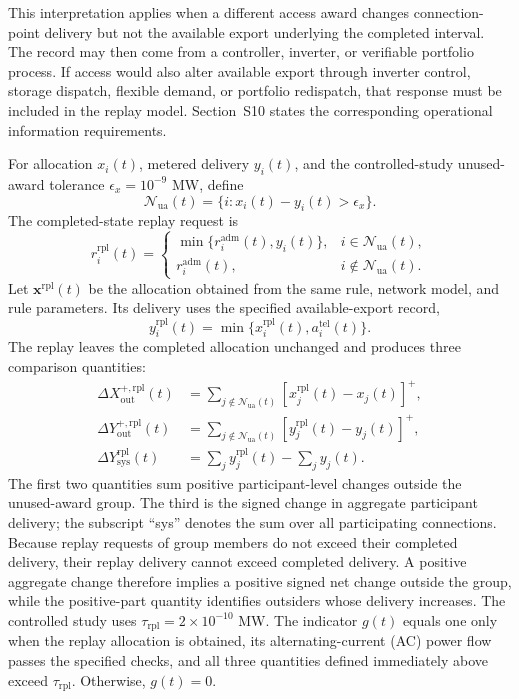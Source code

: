 \documentclass[11pt]{article}
\begin{document}
This interpretation applies when a different access award changes
connection-point delivery but not the available export underlying the completed
interval. The record may then come from a controller, inverter, or verifiable
portfolio process. If access would also alter available export through inverter
control, storage dispatch, flexible demand, or portfolio redispatch, that
response must be included in the replay model. Section~S10 states the
corresponding operational information requirements.

For allocation $x_i(t)$, metered delivery $y_i(t)$, and the controlled-study
unused-award tolerance $\epsilon_x=10^{-9}$ MW, define
\begin{equation}
\mathcal N_{\mathrm{ua}}(t)=\{i:x_i(t)-y_i(t)>\epsilon_x\}.
\label{eq:supp_unused_award_group}
\end{equation}
The completed-state replay request is
\begin{equation}
r_i^{\mathrm{rpl}}(t)=
\begin{cases}
\min\{r_i^{\mathrm{adm}}(t),y_i(t)\},&i\in\mathcal N_{\mathrm{ua}}(t),\\
r_i^{\mathrm{adm}}(t),&i\notin\mathcal N_{\mathrm{ua}}(t).
\end{cases}
\label{eq:supp_replay_request}
\end{equation}
Let $\mathbf x^{\mathrm{rpl}}(t)$ be the allocation obtained from the same rule,
network model, and rule parameters. Its delivery uses the specified
available-export record,
\begin{equation}
y_i^{\mathrm{rpl}}(t)=\min\{x_i^{\mathrm{rpl}}(t),
a_i^{\mathrm{tel}}(t)\}.
\label{eq:supp_replay_delivery}
\end{equation}
The replay leaves the completed allocation unchanged and produces three
comparison quantities:
\begin{align}
\Delta X_{\mathrm{out}}^{+,\mathrm{rpl}}(t)&=\sum_{j\notin\mathcal N_{\mathrm{ua}}(t)}
[x_j^{\mathrm{rpl}}(t)-x_j(t)]^+,\\
\Delta Y_{\mathrm{out}}^{+,\mathrm{rpl}}(t)&=\sum_{j\notin\mathcal N_{\mathrm{ua}}(t)}
[y_j^{\mathrm{rpl}}(t)-y_j(t)]^+,\\
\Delta Y_{\mathrm{sys}}^{\mathrm{rpl}}(t)&=\sum_j y_j^{\mathrm{rpl}}(t)-\sum_jy_j(t).
\label{eq:supp_replay_recovery_metrics}
\end{align}
The first two quantities sum positive participant-level changes outside the
unused-award group. The third is the signed change in aggregate participant
delivery; the subscript ``sys'' denotes the sum over all participating
connections. Because replay requests of group members do not exceed
their completed delivery, their replay delivery cannot exceed completed
delivery. A positive aggregate change therefore implies a positive signed net
change outside the group, while the positive-part quantity identifies outsiders
whose delivery increases. The controlled study uses
$\tau_{\mathrm{rpl}}=2\times10^{-10}$ MW. The indicator
$g(t)$ equals one only when the replay allocation is obtained, its
alternating-current (AC) power flow passes the specified checks, and all three
quantities defined immediately above exceed
$\tau_{\mathrm{rpl}}$. Otherwise, $g(t)=0$.
\end{document}
